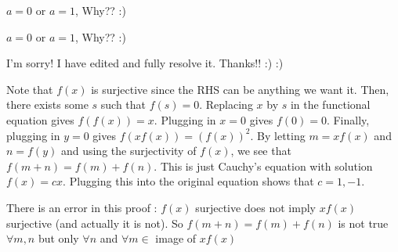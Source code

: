 \begin{solution}
	$ a=0$ or $a=1$, Why?? :)
\end{solution}



\begin{solution}
	\begin{tcolorbox}$ a=0$ or $a=1$, Why?? :)\end{tcolorbox}

I'm sorry! I have edited and fully resolve it. Thanks!!  :)  :)
\end{solution}



\begin{solution}
	\begin{tcolorbox}Note that $f(x)$ is surjective since the RHS can be anything we want it. Then, there exists some $s$ such that $f(s)=0$. Replacing $x$ by $s$ in the functional equation gives $f(f(x))=x$. Plugging in $x=0$ gives $f(0)=0$. Finally, plugging in $y=0$ gives $f(xf(x))=(f(x))^{2}$. By letting $m=xf(x)$ and $n=f(y)$ and using the surjectivity of $f(x)$, we see that $f(m+n)=f(m)+f(n)$. This is just Cauchy's equation with solution $f(x)=cx$. Plugging this into the original equation shows that $c=1,-1$.\end{tcolorbox}

There is an error in this proof : $f(x)$ surjective does not imply $xf(x)$ surjective (and actually it is not). So $f(m+n)=f(m)+f(n)$ is not true $\forall m,n$ but only $\forall n$ and $\forall m\in $ image of $xf(x)$
\end{solution}



